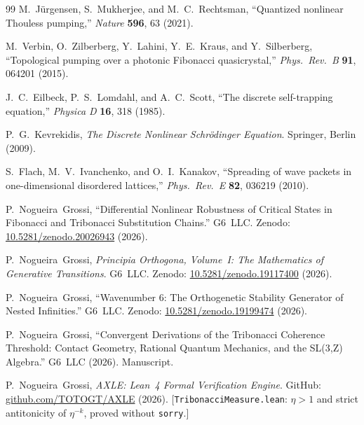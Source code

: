 \documentclass[12pt,a4paper]{article}
\begin{document}
\begin{thebibliography}{99}
M.~J\"{u}rgensen, S.~Mukherjee, and M.~C.~Rechtsman,
``Quantized nonlinear Thouless pumping,''
\textit{Nature} \textbf{596}, 63 (2021).

M.~Verbin, O.~Zilberberg, Y.~Lahini, Y.~E.~Kraus, and Y.~Silberberg,
``Topological pumping over a photonic Fibonacci quasicrystal,''
\textit{Phys.\ Rev.\ B} \textbf{91}, 064201 (2015).

J.~C.~Eilbeck, P.~S.~Lomdahl, and A.~C.~Scott,
``The discrete self-trapping equation,''
\textit{Physica D} \textbf{16}, 318 (1985).

P.~G.~Kevrekidis,
\textit{The Discrete Nonlinear Schr\"{o}dinger Equation}.
Springer, Berlin (2009).

S.~Flach, M.~V.~Ivanchenko, and O.~I.~Kanakov,
``Spreading of wave packets in one-dimensional disordered lattices,''
\textit{Phys.\ Rev.\ E} \textbf{82}, 036219 (2010).

P.~Nogueira~Grossi,
``Differential Nonlinear Robustness of Critical States in Fibonacci and
Tribonacci Substitution Chains.''
G6~LLC. Zenodo: \href{https://doi.org/10.5281/zenodo.20026943}{10.5281/zenodo.20026943} (2026).

P.~Nogueira~Grossi,
\textit{Principia Orthogona, Volume~I: The Mathematics of Generative Transitions}.
G6~LLC. Zenodo: \href{https://doi.org/10.5281/zenodo.19117400}{10.5281/zenodo.19117400} (2026).

P.~Nogueira~Grossi,
``Wavenumber 6: The Orthogenetic Stability Generator of Nested Infinities.''
G6~LLC. Zenodo: \href{https://doi.org/10.5281/zenodo.19199474}{10.5281/zenodo.19199474} (2026).

P.~Nogueira~Grossi,
``Convergent Derivations of the Tribonacci Coherence Threshold:
Contact Geometry, Rational Quantum Mechanics, and the SL(3,Z) Algebra.''
G6~LLC (2026). Manuscript.

P.~Nogueira~Grossi,
\textit{AXLE: Lean~4 Formal Verification Engine}.
GitHub: \href{https://github.com/TOTOGT/AXLE}{github.com/TOTOGT/AXLE} (2026).
[\texttt{TribonacciMeasure.lean}: $\eta > 1$ and strict antitonicity of
$\eta^{-k}$, proved without \texttt{sorry}.]

\end{thebibliography}
\end{document}
